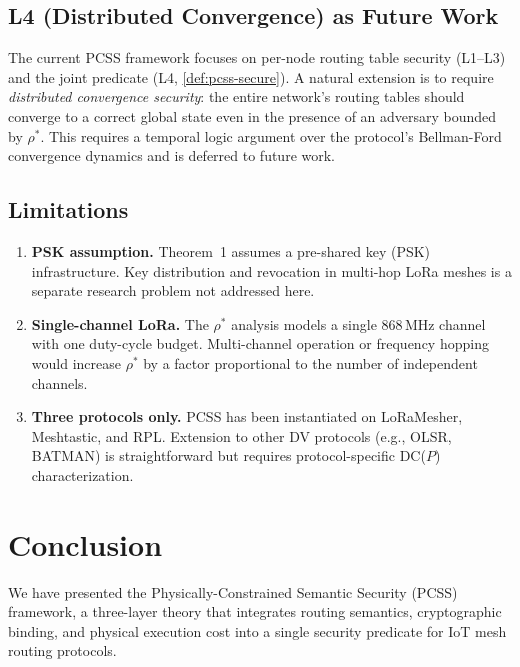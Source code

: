\documentclass[journal,compsoc]{IEEEtran}
\theoremstyle{plain}
\theoremstyle{definition}
\theoremstyle{remark}
\newcommand{\rhostar}{\rho^*}
\begin{document}
\subsection{L4 (Distributed Convergence) as Future Work}

The current PCSS framework focuses on per-node routing table security
(L1--L3) and the joint predicate (L4, \cref{def:pcss-secure}).  A natural
extension is to require \emph{distributed convergence security}: the
entire network's routing tables should converge to a correct global state
even in the presence of an adversary bounded by $\rhostar$.  This requires
a temporal logic argument over the protocol's Bellman-Ford convergence
dynamics and is deferred to future work.

\subsection{Limitations}

\begin{enumerate}[label=(\roman*), nosep]
  \item \textbf{PSK assumption.}  Theorem~1 assumes a pre-shared key (PSK)
        infrastructure.  Key distribution and revocation in multi-hop LoRa
        meshes is a separate research problem not addressed here.
  \item \textbf{Single-channel LoRa.}  The $\rhostar$ analysis models a
        single 868\,MHz channel with one duty-cycle budget.  Multi-channel
        operation or frequency hopping would increase $\rhostar$ by a factor
        proportional to the number of independent channels.
  \item \textbf{Three protocols only.}  PCSS has been instantiated on
        LoRaMesher, Meshtastic, and RPL.  Extension to other DV protocols
        (e.g., OLSR, BATMAN) is straightforward but requires
        protocol-specific DC($P$) characterization.
\end{enumerate}

\section{Conclusion}
\label{sec:conclusion}

We have presented the Physically-Constrained Semantic Security (PCSS)
framework, a three-layer theory that integrates routing semantics,
cryptographic binding, and physical execution cost into a single
security predicate for IoT mesh routing protocols.
\end{document}
